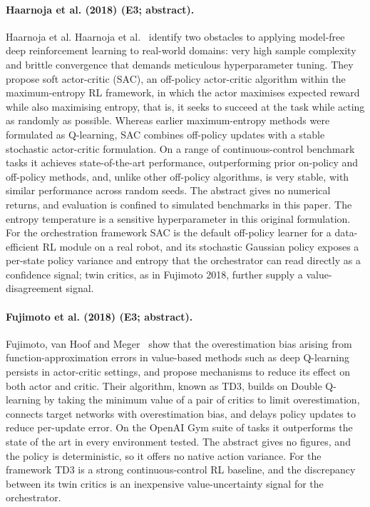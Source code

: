 \documentclass[10pt,a4paper]{article}
\begin{document}
\paragraph{Haarnoja et al. (2018) (E3; abstract).} Haarnoja et al. Haarnoja et al.~\cite{Haarnoja2018} identify two obstacles to applying model-free deep reinforcement learning to real-world domains: very high sample complexity and brittle convergence that demands meticulous hyperparameter tuning. They propose soft actor-critic (SAC), an off-policy actor-critic algorithm within the maximum-entropy RL framework, in which the actor maximises expected reward while also maximising entropy, that is, it seeks to succeed at the task while acting as randomly as possible. Whereas earlier maximum-entropy methods were formulated as Q-learning, SAC combines off-policy updates with a stable stochastic actor-critic formulation. On a range of continuous-control benchmark tasks it achieves state-of-the-art performance, outperforming prior on-policy and off-policy methods, and, unlike other off-policy algorithms, is very stable, with similar performance across random seeds. The abstract gives no numerical returns, and evaluation is confined to simulated benchmarks in this paper. The entropy temperature is a sensitive hyperparameter in this original formulation. For the orchestration framework SAC is the default off-policy learner for a data-efficient RL module on a real robot, and its stochastic Gaussian policy exposes a per-state policy variance and entropy that the orchestrator can read directly as a confidence signal; twin critics, as in Fujimoto 2018, further supply a value-disagreement signal.

\paragraph{Fujimoto et al. (2018) (E3; abstract).} Fujimoto, van Hoof and Meger~\cite{Fujimoto2018} show that the overestimation bias arising from function-approximation errors in value-based methods such as deep Q-learning persists in actor-critic settings, and propose mechanisms to reduce its effect on both actor and critic. Their algorithm, known as TD3, builds on Double Q-learning by taking the minimum value of a pair of critics to limit overestimation, connects target networks with overestimation bias, and delays policy updates to reduce per-update error. On the OpenAI Gym suite of tasks it outperforms the state of the art in every environment tested. The abstract gives no figures, and the policy is deterministic, so it offers no native action variance. For the framework TD3 is a strong continuous-control RL baseline, and the discrepancy between its twin critics is an inexpensive value-uncertainty signal for the orchestrator.
\end{document}

